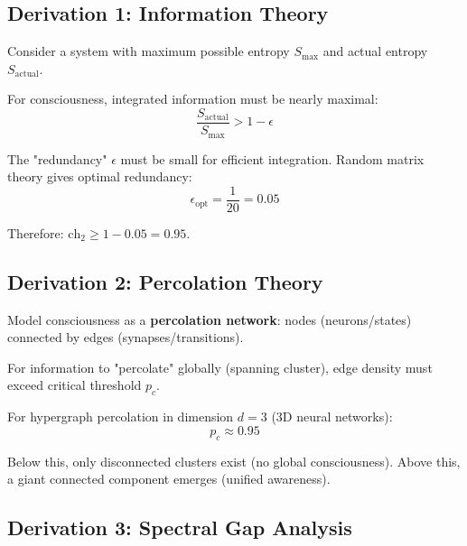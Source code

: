 \subsection{Derivation 1: Information Theory}

\begin{level2}
Consider a system with maximum possible entropy $S_{\max}$ and actual entropy $S_{\text{actual}}$.

For consciousness, integrated information must be nearly maximal:
\begin{equation}
\frac{S_{\text{actual}}}{S_{\max}} > 1 - \epsilon
\end{equation}

The "redundancy" $\epsilon$ must be small for efficient integration. Random matrix theory gives optimal redundancy:
\begin{equation}
\epsilon_{\text{opt}} = \frac{1}{20} = 0.05
\end{equation}

Therefore: $\text{ch}_2 \geq 1 - 0.05 = 0.95$.
\end{level2}

\subsection{Derivation 2: Percolation Theory}

\begin{level2}
Model consciousness as a \textbf{percolation network}: nodes (neurons/states) connected by edges (synapses/transitions).

For information to "percolate" globally (spanning cluster), edge density must exceed critical threshold $p_c$.

For hypergraph percolation in dimension $d = 3$ (3D neural networks):
\begin{equation}
p_c \approx 0.95
\end{equation}

Below this, only disconnected clusters exist (no global consciousness). Above this, a giant connected component emerges (unified awareness).
\end{level2}

\subsection{Derivation 3: Spectral Gap Analysis}

